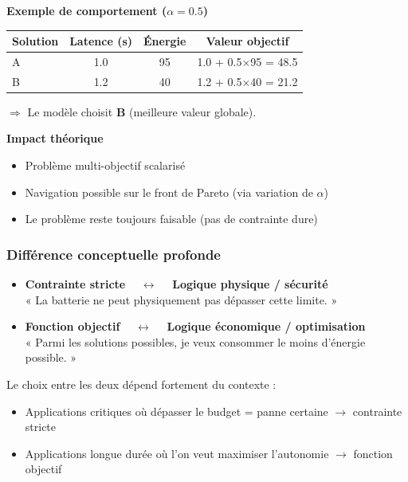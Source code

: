 \documentclass[a4paper,11pt]{article}
\begin{document}
\textbf{Exemple de comportement ($\alpha = 0.5$)}
\begin{center}
\begin{tabular}{lccc}
\toprule
Solution & Latence (s) & Énergie & Valeur objectif \\
\midrule
A & 1.0 & 95 & 1.0 + 0.5×95 = 48.5 \\
B & 1.2 & 40 & 1.2 + 0.5×40 = 21.2 \\
\bottomrule
\end{tabular}
\end{center}

$\Rightarrow$ Le modèle choisit \textbf{B} (meilleure valeur globale).

\textbf{Impact théorique}
\begin{itemize}[leftmargin=*]
    \item Problème multi-objectif scalarisé
    \item Navigation possible sur le front de Pareto (via variation de $\alpha$)
    \item Le problème reste toujours faisable (pas de contrainte dure)
\end{itemize}

\subsubsection{Différence conceptuelle profonde}

\begin{itemize}[leftmargin=*]
    \item \textbf{Contrainte stricte} $\quad\leftrightarrow\quad$ \textbf{Logique physique / sécurité} \\
    \quad « La batterie ne peut physiquement pas dépasser cette limite. »
    
    \item \textbf{Fonction objectif} $\quad\leftrightarrow\quad$ \textbf{Logique économique / optimisation} \\
    \quad « Parmi les solutions possibles, je veux consommer le moins d’énergie possible. »
\end{itemize}

Le choix entre les deux dépend fortement du contexte :
\begin{itemize}[leftmargin=*]
    \item Applications critiques où dépasser le budget = panne certaine $\to$ contrainte stricte
    \item Applications longue durée où l’on veut maximiser l’autonomie $\to$ fonction objectif
\end{itemize}
\end{document}
